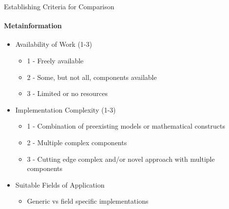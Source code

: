 \documentclass{beamer}
\begin{document}
\begin{frame}[t]{Establishing Criteria for Comparison}
  \framesubtitle{Metainformation}
  \begin{itemize}
    \setlength\itemsep{1em}
    \item Availability of Work (1-3)
      \begin{itemize}
        \item 1 - Freely available
        \item 2 - Some, but not all, components available
        \item 3 - Limited or no resources
      \end{itemize}

    \item Implementation Complexity (1-3)
      \begin{itemize}
        \item 1 - Combination of preexisting models or mathematical constructs
        \item 2 - Multiple complex components
        \item 3 - Cutting edge complex and/or novel approach with multiple components
      \end{itemize}

    \item Suitable Fields of Application
      \begin{itemize}
        \item Generic vs field specific implementations
      \end{itemize}

  \end{itemize}
\end{frame}
\end{document}
